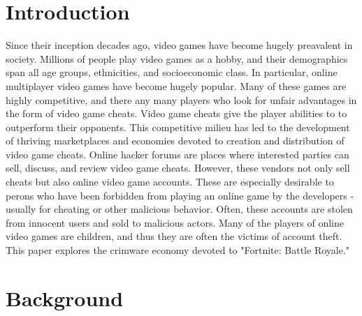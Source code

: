 \documentclass[sigconf]{acmart}
\begin{document}


\maketitle

\section{Introduction}

Since their inception decades ago, video games have become hugely preavalent in
society. Millions of people play video games as a hobby, and their demographics
span all age groups, ethnicities, and socioeconomic class. In particular, online
multiplayer video games have become hugely popular. Many of these games are 
highly competitive, and there any many players who look for unfair advantages in
the form of video game cheats. Video game cheats give the player abilities to 
to outperform their opponents. This competitive milieu has led to the
development of thriving marketplaces and economies devoted to creation and 
distribution of video game cheats. Online hacker forums are places where 
interested parties can sell, discuss, and review video game cheats. However, 
these vendors not only sell cheats but also online video game accounts. These
are especially desirable to perons who have been forbidden from playing an 
online game by the developers - usually for cheating or other malicious
behavior. Often, these accounts are stolen from innocent users and sold to 
malicious actors. Many of the players of online video games are 
children, and thus they are often the victims of account theft. This paper 
explores the crimware economy devoted to "Fortnite: Battle Royale."

\section{Background}
\end{document}
